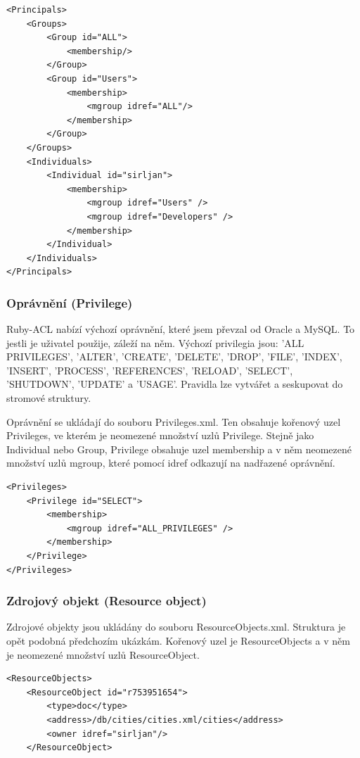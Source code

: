 \lstset{language=XML}
\begin{lstlisting}
<Principals>
    <Groups>
        <Group id="ALL">
            <membership/>
        </Group>
        <Group id="Users">
            <membership>
                <mgroup idref="ALL"/>
            </membership>
        </Group>
    </Groups>
    <Individuals>
        <Individual id="sirljan">
            <membership>
                <mgroup idref="Users" />
                <mgroup idref="Developers" />
            </membership>
        </Individual>
    </Individuals>
</Principals>
\end{lstlisting}

\subsubsection {Oprávnění (Privilege)}
Ruby-ACL nabízí výchozí oprávnění, které jsem převzal od Oracle a MySQL. To jestli je uživatel použije, záleží na něm. 
Výchozí privilegia jsou: 'ALL PRIVILEGES', 'ALTER', 'CREATE', 'DELETE', 'DROP', 'FILE', 'INDEX', 'INSERT', 'PROCESS', 'REFERENCES', 'RELOAD', 'SELECT', 'SHUTDOWN', 'UPDATE' a 'USAGE'.
Pravidla lze vytvářet a seskupovat do stromové struktury.

Oprávnění se ukládají do souboru Privileges.xml. Ten obsahuje kořenový uzel Privileges, ve kterém je neomezené množství uzlů Privilege. Stejně jako Individual nebo Group, Privilege obsahuje uzel membership a v něm neomezené množství uzlů mgroup, které pomocí idref odkazují na nadřazené oprávnění.

\begin{lstlisting}
<Privileges>
    <Privilege id="SELECT">
        <membership>             
            <mgroup idref="ALL_PRIVILEGES" />         
        </membership>
    </Privilege>
</Privileges>
\end{lstlisting}

\subsubsection {Zdrojový objekt (Resource object)}

Zdrojové objekty jsou ukládány do souboru ResourceObjects.xml. Struktura je opět podobná předchozím ukázkám. Kořenový uzel je ResourceObjects a v něm je neomezené množství uzlů ResourceObject.

\begin{lstlisting}
<ResourceObjects>
    <ResourceObject id="r753951654">
        <type>doc</type>
        <address>/db/cities/cities.xml/cities</address>
        <owner idref="sirljan"/>
    </ResourceObject>
\end{lstlisting}


